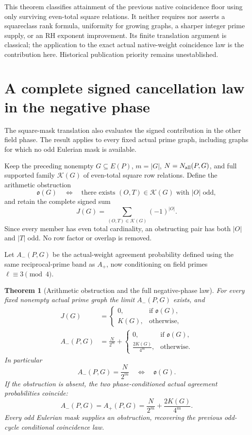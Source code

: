 \documentclass[11pt]{article}
\newtheorem{theorem}{Theorem}[section]
\begin{document}
This theorem classifies attainment of the previous native coincidence
floor using only surviving even-total square relations. It neither
requires nor asserts a squareclass rank formula, uniformity for growing
graphs, a sharper integer prime supply, or an RH exponent improvement.
Its finite translation argument is classical; the application to
the exact actual native-weight coincidence law is the contribution
here. Historical publication priority remains unestablished.

\section{A complete signed cancellation law in the negative phase}
\label{sec:native-negative-phase-dichotomy}

The square-mask translation also evaluates the signed contribution in
the other field phase. The result applies to every fixed actual prime
graph, including graphs for which no odd Eulerian mask is available.

Keep the preceding nonempty \(G\subseteq E(P)\), \(m=|G|\),
\(N=N_{\rm all}(P,G)\), and full supported family \(\mathcal K(G)\)
of even-total square row relations. Define the arithmetic obstruction
\[
 \mathfrak o(G)\quad\Longleftrightarrow\quad
  \text{there exists }(O,T)\in\mathcal K(G)\text{ with }|O|\text{ odd},
\]
and retain the complete signed sum
\[
                       J(G)=\sum_{(O,T)\in\mathcal K(G)}(-1)^{|O|}.
\]
Since every member has even total cardinality, an obstructing pair
has both \(|O|\) and \(|T|\) odd. No row factor or overlap is removed.

Let \(A_-(P,G)\) be the actual-weight agreement probability defined
using the same reciprocal-prime band as \(A_+\), now conditioning
on field primes \(\ell\equiv3\pmod4\).
\begin{theorem}[Arithmetic obstruction and the full negative-phase law]
\label{thm:native-negative-phase-dichotomy}
For every fixed nonempty actual prime graph the limit \(A_-(P,G)\)
exists, and
\begin{align}
 J(G)&=
 \begin{cases}
  0,&\text{if }\mathfrak o(G),\\
  K(G),&\text{otherwise},
 \end{cases}                                             \label{eq:native-parity-annihilation}\\
 A_-(P,G)&=\frac{N}{2^m}+
 \begin{cases}
  0,&\text{if }\mathfrak o(G),\\
  \displaystyle\frac{2K(G)}{4^m},&\text{otherwise}.
 \end{cases}                                             \label{eq:native-negative-dichotomy}
\end{align}
In particular
\[
           A_-(P,G)=\frac{N}{2^m}
                    \quad\Longleftrightarrow\quad\mathfrak o(G).
\]
If the obstruction is absent, the two phase-conditioned actual
agreement probabilities coincide:
\[
                   A_-(P,G)=A_+(P,G)
                      =\frac{N}{2^m}+\frac{2K(G)}{4^m}.
\]
Every odd Eulerian mask supplies an obstruction, recovering the
previous odd-cycle conditional coincidence law.
\end{theorem}
\end{document}
